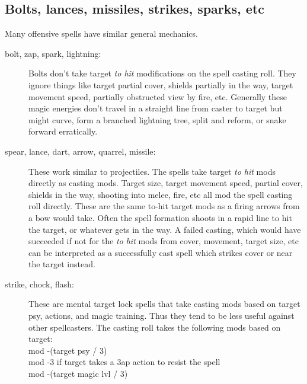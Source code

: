 \subsection*{Bolts, lances, missiles, strikes, sparks, etc}
Many offensive spells have similar general mechanics. 

\begin{description}

\item[bolt, zap, spark, lightning:]
Bolts don't take target \emph{to hit} modifications on the spell casting roll. They ignore things like target partial cover, shields partially in the way, target movement speed, partially obstructed view by fire, etc.
Generally these magic energies don't travel in a straight line from caster to target but might curve, form a branched lightning tree, split and reform, or snake forward erratically.

\item[spear, lance, dart, arrow, quarrel, missile:]
These work similar to projectiles. The spells take target \emph{to hit} mods directly as casting mods. Target size, target movement speed, partial cover, shields in the way, shooting into melee, fire, etc all mod the spell casting roll directly. These are the same to-hit target mods as a firing arrows from a bow would take. 
Often the spell formation shoots in a rapid line to hit the target, or whatever gets in the way. A failed casting, which would have succeeded if not for the \emph{to hit} mods from cover, movement, target size, etc can be interpreted as a successfully cast spell which strikes cover or near the target instead.


\item[strike, chock, flash:] %
These are mental target lock spells that take casting mods based on target psy, actions, and magic training. Thus they tend to be less useful against other spellcasters. The casting roll takes the following mods based on target:\\
mod -(target psy / 3)\\
mod -3 if target takes a 3ap action to resist the spell\\
mod -(target magic lvl / 3)\\

\end{description}


